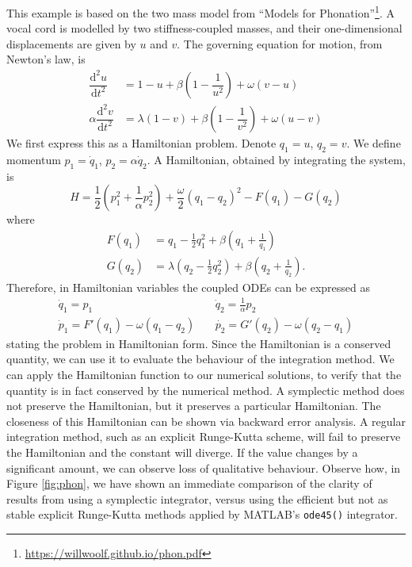 This example is based on the two mass model from ``Models for Phonation''\footnote{
	\url{https://willwoolf.github.io/phon.pdf}
}.
A vocal cord is modelled by two stiffness-coupled masses, and their one-dimensional displacements are given by $u$ and $v$.
The governing equation for motion, from Newton's law, is
\begin{align*}
	\dfrac{\mathrm{d}^2 u}{\mathrm{d}t^2} &= 1 - u + \beta \left(1 - \dfrac{1}{u^2}\right) + \omega (v - u) \\
	\alpha \dfrac{\mathrm{d}^2 v}{\mathrm{d}t^2} &= \lambda(1 - v) + \beta \left(1 - \dfrac{1}{v^2}\right) + \omega (u - v)
\end{align*}
We first express this as a Hamiltonian problem. Denote $q_1 = u$, $q_2 = v$.
We define momentum $p_1 = \dot{q}_1$, $p_2 = \alpha \dot{q}_2$.
A Hamiltonian, obtained by integrating the system, is
\begin{equation*}
	H = \frac{1}{2} \left( p_1^2 + \frac{1}{\alpha} p_2^2 \right) + \frac{\omega}{2}(q_1 - q_2)^2 - F(q_1) - G(q_2)
\end{equation*}
where
\begin{align*}
	F(q_1) &= q_1 - \frac{1}{2}q_1^2 + \beta \left( q_1 + \frac{1}{q_1} \right) \\
	G(q_2) &= \lambda \left(q_2 - \frac{1}{2}q_2^2 \right) + \beta \left( q_2 + \frac{1}{q_2} \right).
\end{align*}
Therefore, in Hamiltonian variables the coupled ODEs can be expressed as
\begin{eqnarray*}
	\dot{q}_1 = p_1 & ~ & \dot{q}_2 = \frac{1}{\alpha} p_2 \\
	\dot{p}_1 = F'(q_1) - \omega(q_1 - q_2) & ~ & \dot{p_2} = G'(q_2) - \omega(q_2 - q_1)
\end{eqnarray*}
stating the problem in Hamiltonian form.
Since the Hamiltonian is a conserved quantity, we can use it to evaluate the behaviour of the integration method.
We can apply the Hamiltonian function to our numerical solutions, to verify that the quantity is in fact conserved by the numerical method.
A symplectic method does not preserve the Hamiltonian, but it preserves a particular Hamiltonian.
The closeness of this Hamiltonian can be shown via backward error analysis.
A regular integration method, such as an explicit Runge-Kutta scheme, will fail to preserve the Hamiltonian and the constant will diverge.
If the value changes by a significant amount, we can observe loss of qualitative behaviour.
Observe how, in Figure \ref{fig:phon}, we have shown an immediate comparison of the clarity of results from using a symplectic integrator,
versus using the efficient but not as stable explicit Runge-Kutta methods applied by MATLAB's \texttt{ode45()} integrator.

